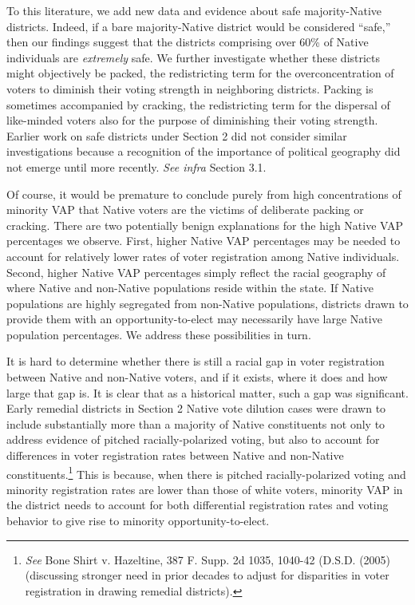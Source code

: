 \documentclass[12pt]{article}
\begin{document}
To this literature, we add new data and evidence about safe majority-Native districts.  Indeed, if a bare majority-Native district would be considered ``safe,'' then our findings suggest that the districts comprising over 60\% of Native individuals are \textit{extremely} safe. We further investigate whether these districts might objectively be packed, the redistricting term for the overconcentration of voters to diminish their voting strength in neighboring districts. Packing is sometimes accompanied by cracking, the redistricting term for the dispersal of like-minded voters also for the purpose of diminishing their voting strength. Earlier work on safe districts under Section 2 did not consider similar investigations because a recognition of the importance of political geography did not emerge until more recently.  \textit{See infra} Section 3.1.

Of course, it would be premature to conclude purely from high concentrations of minority VAP that Native voters are the victims of deliberate packing or cracking. There are two potentially benign explanations for the high Native VAP percentages we observe. First, higher Native VAP percentages may be needed to account for relatively lower rates of voter registration among Native individuals.  Second, higher Native VAP percentages simply reflect the racial geography of where Native and non-Native populations reside within the state.  If Native populations are highly segregated from non-Native populations, districts drawn to provide them with an opportunity-to-elect may necessarily have large Native population percentages. We address these possibilities in turn.

It is hard to determine whether there is still a racial gap in voter registration between Native and non-Native voters, and if it exists, where it does and how large that gap is.  It is clear that as a historical matter, such a gap was significant.  Early remedial districts in Section 2 Native vote dilution cases were drawn to include substantially more than a majority of Native constituents not only to address evidence of pitched racially-polarized voting, but also to account for differences in voter registration rates between Native and non-Native constituents.\footnote{\textit{See} Bone Shirt v. Hazeltine, 387 F. Supp. 2d 1035, 1040-42 (D.S.D. (2005) (discussing stronger need in prior decades to adjust for disparities in voter registration in drawing remedial districts).} This is because, when there is pitched racially-polarized voting and minority registration rates are lower than those of white voters, minority VAP in the district needs to account for both differential registration rates and voting behavior to give rise to minority opportunity-to-elect.
\end{document}
